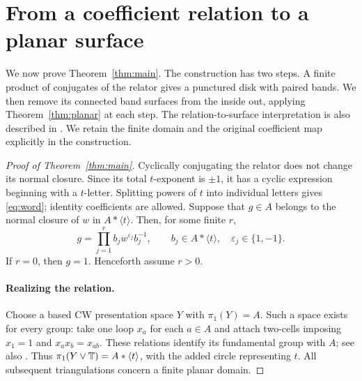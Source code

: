\section{From a coefficient relation to a planar surface}
\label{sec:topology}

We now prove Theorem~\ref{thm:main}. The construction has two steps. A
finite product of conjugates of the relator gives a punctured disk with
paired bands. We then remove its connected band surfaces from the inside
out, applying Theorem~\ref{thm:planar} at each step.
The relation-to-surface interpretation is also described in
\cite[preprint Section 2, especially Example 2.5]{Chen2026}. We retain the finite
domain and the original coefficient map explicitly in the construction.

\begin{proof}[Proof of Theorem~\ref{thm:main}]
Cyclically conjugating the relator does not change its normal closure.
Since its total $t$-exponent is $\pm1$, it has a cyclic expression beginning
with a $t$-letter. Splitting powers of $t$ into individual letters gives
\eqref{eq:word}; identity coefficients are allowed. Suppose that
$g\in A$ belongs to the normal closure of $w$ in $A*\langle t\rangle$.
Then, for some finite $r$,
\begin{equation}\label{eq:normal-closure-product}
 g=\prod_{j=1}^{r} b_jw^{\varepsilon_j}b_j^{-1},
 \qquad b_j\in A*\langle t\rangle,\quad
 \varepsilon_j\in\{1,-1\}.
\end{equation}
If $r=0$, then $g=1$. Henceforth assume $r>0$.

\paragraph{Realizing the relation.}
Choose a based CW presentation space $Y$ with $\pi_1(Y)=A$. Such a space
exists for every group: take one loop $x_a$ for each $a\in A$ and attach
two-cells imposing $x_1=1$ and $x_ax_b=x_{ab}$. These relations identify
its fundamental group with $A$; see also
\cite[Corollary 1.28]{Hatcher2002}. Thus
$\pi_1(Y\vee\mathbb T)=A*\langle t\rangle$, with the added circle representing
$t$. All subsequent triangulations concern a finite planar domain.


\end{proof}
